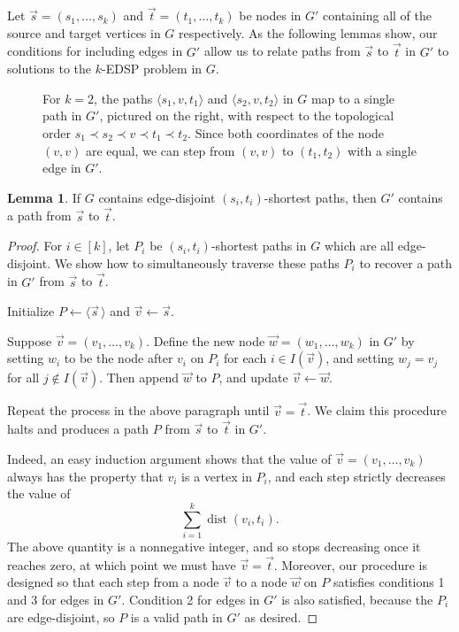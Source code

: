 \documentclass[11pt]{article}
\newcommand{\pair}[1]{\langle #1\rangle}
\DeclareMathOperator{\dist}{dist}
\theoremstyle{definition}
\newtheorem{lemma}[theorem]{Lemma}
\begin{document}
    Let $\vec{s} = (s_1, \dots, s_k)$ and $\vec{t} = (t_1, \dots, t_k)$ be nodes in $G'$ containing all of the source and target vertices in $G$ respectively.
    As the following lemmas show, our conditions for including edges in $G'$ allow us to relate paths from $\vec{s}$ to $\vec{t}$ in $G'$ to solutions to the \textsf{$k$-EDSP} problem in $G$.

\begin{figure}[t]
    \centering
    
    \caption{For $k=2$, the paths $\pair{s_1, v, t_1}$ and $\pair{s_2, v, t_2}$ in $G$ map to a single path in $G'$, pictured on the right, with respect to the topological order $s_1 \prec s_2 \prec v \prec t_1 \prec t_2$.
    Since both coordinates of the node $(v,v)$ are equal, we can step from $(v,v)$ to $(t_1, t_2)$ with a single edge in $G'$.} 
    \label{fig:k-EDSP}
\end{figure}

    \begin{lemma}
        \label{metagraph-EDP-to-path}
        If $G$ contains edge-disjoint $(s_i,t_i)$-shortest paths, then $G'$ contains a path from $\vec{s}$ to $\vec{t}$.
    \end{lemma}
    \begin{proof}
        For $i\in [k]$, let $P_i$  be $(s_i,t_i)$-shortest paths in $G$ which are all edge-disjoint.
        We show how to simultaneously traverse these paths $P_i$ to recover a path in $G'$ from $\vec{s}$ to $\vec{t}$.

                Initialize $P \leftarrow \langle \vec{s}\,\rangle$ and  $\vec{v} \leftarrow \vec{s}$.

        Suppose $\vec{v} = (v_1, \dots, v_k)$.
        Define the new node $\vec{w} = (w_1, \dots, w_k)$ in $G'$ by setting $w_i$ to be the node after $v_i$ on $P_i$ for each $i\in I(\vec{v})$, and setting $w_j = v_j$ for all $j\not\in I(\vec{v})$.
        Then append $\vec{w}$ to $P$, and update $\vec{v} \leftarrow \vec{w}$.

        Repeat the process in the above paragraph until $\vec{v} = \vec{t}$.
        We claim this procedure halts and produces a path $P$ from $\vec{s}$ to $\vec{t}$ in $G'$.

        Indeed, an easy induction argument shows that the value of $\vec{v} = (v_1, \dots, v_k)$ always has the property that $v_i$ is a vertex in $P_i$, and each step strictly decreases the value of 
            \[\sum_{i=1}^k \dist(v_i,t_i).\]
        The above quantity is a nonnegative integer, and so stops decreasing once it reaches zero, at which point we must have $\vec{v} = \vec{t}$.
        Moreover, our procedure is designed so that each step from a node $\vec{v}$ to a node $\vec{w}$ on $P$ satisfies conditions 1 and 3 for edges in $G'$.
        Condition 2 for edges in $G'$ is also satisfied, because the $P_i$ are edge-disjoint, so $P$ is a valid path in $G'$ as desired.
    \end{proof}
    
\end{document}
